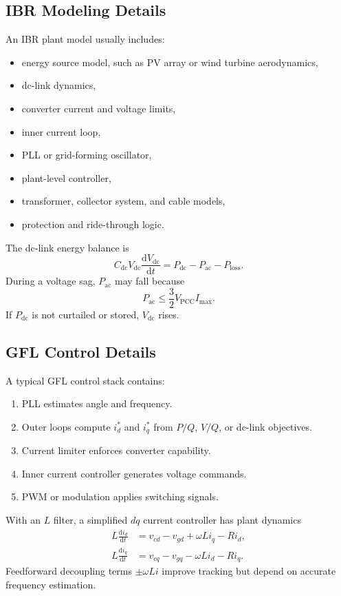 \documentclass[11pt]{article}
\newcommand{\dd}{\mathrm{d}}
\begin{document}
\subsection{IBR Modeling Details}
An IBR plant model usually includes:
\begin{itemize}
  \item energy source model, such as PV array or wind turbine aerodynamics,
  \item dc-link dynamics,
  \item converter current and voltage limits,
  \item inner current loop,
  \item PLL or grid-forming oscillator,
  \item plant-level controller,
  \item transformer, collector system, and cable models,
  \item protection and ride-through logic.
\end{itemize}
The dc-link energy balance is
\begin{equation}
C_{\mathrm{dc}}V_{\mathrm{dc}}\frac{\dd V_{\mathrm{dc}}}{\dd t}
=P_{\mathrm{dc}}-P_{\mathrm{ac}}-P_{\mathrm{loss}}.
\end{equation}
During a voltage sag, $P_{\mathrm{ac}}$ may fall because
\begin{equation}
P_{\mathrm{ac}}\le \frac{3}{2}V_{\mathrm{PCC}}I_{\max}.
\end{equation}
If $P_{\mathrm{dc}}$ is not curtailed or stored, $V_{\mathrm{dc}}$ rises.

\subsection{GFL Control Details}
A typical GFL control stack contains:
\begin{enumerate}
  \item PLL estimates angle and frequency.
  \item Outer loops compute $i_d^*$ and $i_q^*$ from $P/Q$, $V/Q$, or dc-link
  objectives.
  \item Current limiter enforces converter capability.
  \item Inner current controller generates voltage commands.
  \item PWM or modulation applies switching signals.
\end{enumerate}
With an $L$ filter, a simplified $dq$ current controller has plant dynamics
\begin{align}
L\frac{\dd i_d}{\dd t} &= v_{cd}-v_{gd}+\omega L i_q-Ri_d,\\
L\frac{\dd i_q}{\dd t} &= v_{cq}-v_{gq}-\omega L i_d-Ri_q.
\end{align}
Feedforward decoupling terms $\pm \omega L i$ improve tracking but depend on
accurate frequency estimation.
\end{document}
